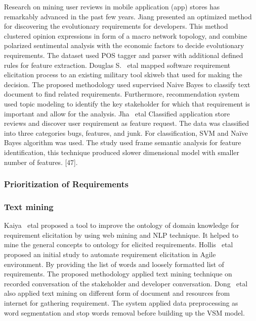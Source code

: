 Research on mining user reviews in mobile application (app) stores has
remarkably advanced in the past few years. Jiang \etal \cite{Jiang:2014}
presented an optimized method for discovering the evolutionary requirements for
developers. This method clustered opinion expressions in form of a macro network
topology, and combine polarized sentimental analysis with the economic factors
to decide evolutionary requirements. The dataset used POS tagger and parser with
additional defined rules for feature extraction. Douglas S. ~etal
\cite{Douglas:S2008} mapped software requirement elicitation process to an
existing military tool skiweb that used for making the decision. The proposed
methodology used supervised Naive Bayes to classify text document to find
related requirements. Furthermore, recommendation system used topic modeling to
identify the key stakeholder for which that requirement is important and allow
for the analysis. Jha ~etal \cite{Jha:2017} Classified application store reviews
and discover user requirement as feature request. The data was classified into
three categories bugs, features, and junk. For classification, SVM and Naïve
Bayes algorithm was used. The study used frame semantic analysis for feature
identification, this technique produced slower  dimensional model
with smaller number of features. [47]. \\

\subsubsection{Prioritization of Requirements} 

\subsubsection{Text mining} 
 Kaiya ~etal \cite {Kaiya:2010} proposed a
tool to improve the ontology of domain knowledge for requirement elicitation by using web mining and NLP
technique. It helped to mine the general
concepts to ontology for elicited requirements.
Hollis ~etal               \cite{Hollis2017} proposed an initial study to
automate requirement elicitation in Agile environment. By providing the list of
words and loosely formatted list of requirements. The proposed methodology
applied text mining technique on recorded conversation of the stakeholder and
developer conversation. Dong ~etal \cite{dong2010}  also applied text mining on
different form of  document and resources from internet for  gathering
requirement. The system applied data preprocessing as word segmentation and stop
words removal before building up the VSM model. 
